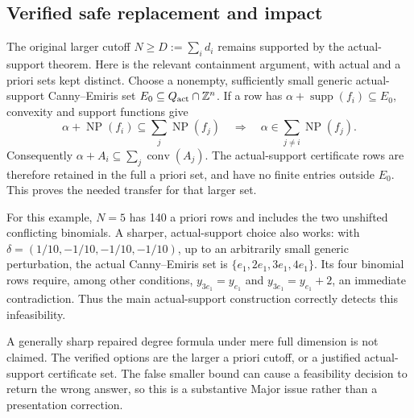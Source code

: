 \documentclass[10pt]{article}
\begin{document}
\subsection*{Verified safe replacement and impact}
The original larger cutoff \(N\ge D:=\sum_i d_i\) remains supported by the actual-support theorem. Here is the relevant containment argument, with actual and a priori sets kept distinct. Choose a nonempty, sufficiently small generic actual-support Canny–Emiris set \(E_0\subseteq Q_{\rm act}\cap\mathbb Z^n\). If a row has \(\alpha+\operatorname{supp}(f_i)\subseteq E_0\), convexity and support functions give \[\alpha+\operatorname{NP}(f_i)\subseteq
 \sum_j\operatorname{NP}(f_j)
 \quad\Longrightarrow\quad
 \alpha\in\sum_{j\ne i}\operatorname{NP}(f_j).\] Consequently \(\alpha+A_i\subseteq\sum_j\operatorname{conv}(A_j)\). The actual-support certificate rows are therefore retained in the full a priori set, and have no finite entries outside \(E_0\). This proves the needed transfer for that larger set.\par
For this example, \(N=5\) has 140 a priori rows and includes the two unshifted conflicting binomials. A sharper, actual-support choice also works: with \(\delta=(1/10,-1/10,-1/10,-1/10)\), up to an arbitrarily small generic perturbation, the actual Canny–Emiris set is \(\{e_1,2e_1,3e_1,4e_1\}\). Its four binomial rows require, among other conditions, \(y_{3e_1}=y_{e_1}\) and \(y_{3e_1}=y_{e_1}+2\), an immediate contradiction. Thus the main actual-support construction correctly detects this infeasibility.\par
A generally sharp repaired degree formula under mere full dimension is not claimed. The verified options are the larger a priori cutoff, or a justified actual-support certificate set. The false smaller bound can cause a feasibility decision to return the wrong answer, so this is a substantive Major issue rather than a presentation correction.\par
\end{document}
